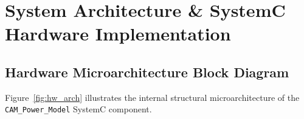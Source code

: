 \documentclass[11pt,a4paper,oneside]{report}
\begin{document}
\chapter[SystemC Implementation]{System Architecture \& SystemC Hardware Implementation}

\section{Hardware Microarchitecture Block Diagram}
Figure~\ref{fig:hw_arch} illustrates the internal structural microarchitecture of the \texttt{CAM\_Power\_Model} SystemC component.
\end{document}
